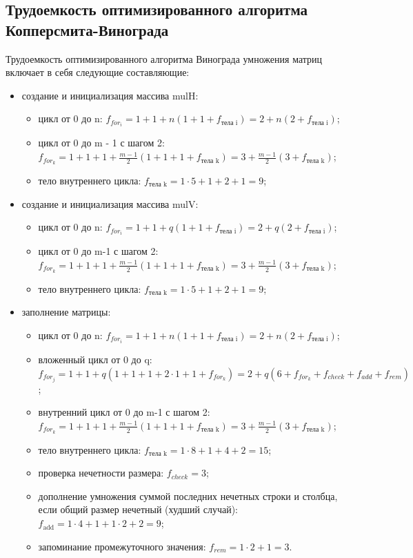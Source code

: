 \documentclass[a4paper,oneside,14pt]{extreport}
\begin{document}
\subsection{Трудоемкость оптимизированного алгоритма Копперсмита-Винограда}
Трудоемкость оптимизированного алгоритма Винограда умножения матриц включает в себя следующие составляющие:
\begin{itemize}
	\item создание и инициализация массива mulH:
	\begin{itemize}
		\item цикл от 0 до n: $f_{for_i}=1 + 1 + n(1 + 1 + f_{\text{тела i}}) = 2 + n(2 + f_{\text{тела i}})$;
		\item цикл от 0 до m - 1 с шагом 2: $f_{for_k}=1 + 1 + 1 + \frac{m-1}{2}(1 + 1 + 1 + f_{\text{тела k}}) = 3 + \frac{m-1}{2}(3 + f_{\text{тела k}})$;
		\item тело внутреннего цикла: $f_{\text{тела k}} = 1 \cdot 5 + 1 + 2 + 1 = 9$;
	\end{itemize}
	\item создание и инициализация массива mulV:
	\begin{itemize}
		\item цикл от 0 до n: $f_{for_i}=1 + 1 + q(1 + 1 + f_{\text{тела i}}) = 2 + q(2 + f_{\text{тела i}})$;
		\item цикл от 0 до m-1 с шагом 2: $f_{for_k}=1 + 1 + 1 + \frac{m-1}{2}(1 + 1 + 1 + f_{\text{тела k}}) = 3 + \frac{m-1}{2}(3 + f_{\text{тела k}})$;
		\item тело внутреннего цикла: $f_{\text{тела k}} = 1 \cdot 5 + 1 + 2 + 1 = 9$;
	\end{itemize}
	\item заполнение матрицы:
	\begin{itemize}
		\item цикл от 0 до n: $f_{for_i}=1 + 1 + n(1 + 1 + f_{\text{тела i}}) = 2 + n(2 + f_{\text{тела i}})$;
		\item вложенный цикл от 0 до q: $f_{for_j}=1 + 1 +q(1 + 1 + 1 + 2\cdot1 + 1 + f_{for_k}) = 2 + q(6 + f_{for_k} + f_{check} + f_{add} + f_{rem})$;
		\item внутренний цикл от 0 до m-1 с шагом 2: $f_{for_k}=1 + 1 + 1 + \frac{m-1}{2}(1 + 1 + 1 + f_{\text{тела k}}) = 3 + \frac{m-1}{2}(3 + f_{\text{тела k}})$;
		\item тело внутреннего цикла: $f_{\text{тела k}} = 1 \cdot 8 + 1 + 4 + 2 = 15$;
		\item проверка нечетности размера: $f_{check} = 3$;
		\item дополнение умножения суммой последних нечетных строки и столбца, если общий размер нечетный (худший случай): $f_{\text{add}} = 1 \cdot 4 + 1 + 1\cdot2 + 2 = 9$;
		\item запоминание промежуточного значения: $f_{rem} = 1\cdot2+1 = 3$.
	\end{itemize}
\end{itemize}
\end{document}

